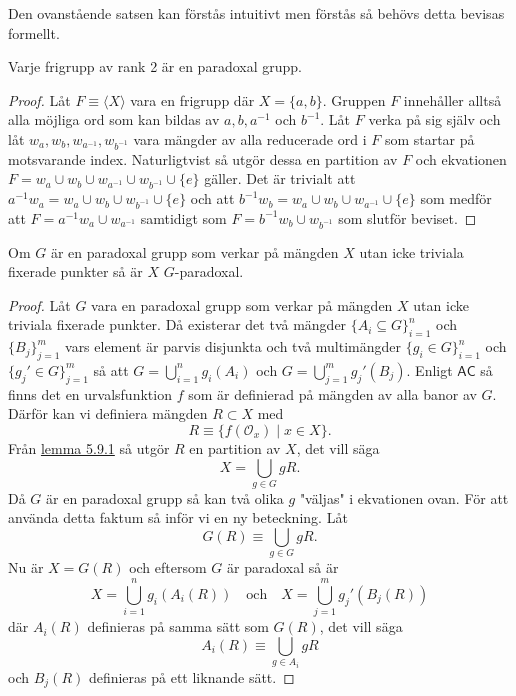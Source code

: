 \documentclass{article}
\newcommand{\orbit}[0]{\mathcal{O}}
\theoremstyle{definition}
\begin{document}
Den ovanstående satsen kan förstås intuitivt men förstås så behövs detta bevisas formellt. 

\hypertarget{sats8.2.2}{}
\begin{mytheo}{}{}
  Varje frigrupp av rank 2 är en paradoxal grupp. 
\end{mytheo}

\begin{proof}
  Låt $F \equiv \langle X \rangle$ vara en frigrupp där $X = \{a, b\}$. Gruppen $F$ innehåller alltså alla möjliga ord som kan bildas 
  av $a, b, a^{-1}$ och $b^{-1}$. Låt $F$ verka på sig själv och låt $w_a, w_b, w_{a^{-1}}, w_{b^{-1}}$ vara mängder av alla reducerade 
  ord i $F$ som startar på motsvarande index. Naturligtvist så utgör dessa en partition av $F$ 
  och ekvationen $F = w_a \cup w_b \cup w_{a^{-1}} \cup w_{b^{-1}} \cup \{e\}$ gäller.
  Det är trivialt att $a^{-1}w_a = w_a \cup w_b \cup w_{b^{-1}} \cup \{e\}$ och att $b^{-1}w_b = w_a \cup w_b \cup w_{a^{-1}} \cup \{e\}$
  som medför att $F = a^{-1} w_a \cup w_{a^{-1}}$ samtidigt som $F = b^{-1}w_b \cup w_{b^{-1}}$ som slutför beviset.
\end{proof}

\hypertarget{sats8.3.2}{}
\begin{mytheo}{}{}
  Om $G$ är en paradoxal grupp som verkar på mängden $X$ utan icke triviala fixerade punkter så är $X$ $G$-paradoxal. 
\end{mytheo}

\begin{proof}{}{}
  Låt $G$ vara en paradoxal grupp som verkar på mängden $X$ utan icke triviala fixerade punkter. Då existerar det 
  två mängder $\{A_i \subseteq G\}_{i = 1}^n$ och $\{B_j\}_{j = 1}^m$ vars element är parvis disjunkta och två multimängder 
  $\{g_i \in G\}_{i = 1}^n$ och $\{g_j' \in G\}_{j = 1}^m$ så att $G = \bigcup_{i = 1}^n g_i(A_i)$ och $G = \bigcup_{j = 1}^m g_j'(B_j)$. 
  Enligt $\mathsf{AC}$
  så finns det en urvalsfunktion $f$ som är definierad på mängden av alla banor av $G$. Därför kan vi definiera mängden $R \subset X$
  med 
  \[R \equiv \{f(\orbit_x) \; | \; x \in X\}.\]
  Från \hyperlink{lemma6.9.1}{lemma 5.9.1} så utgör $R$ en partition av $X$, det vill säga 
  \[X = \bigcup_{g \in G} gR.\]
  Då $G$ är en paradoxal grupp så kan två olika $g$ "väljas" i ekvationen ovan. För att använda detta faktum så inför vi en ny beteckning. 
  Låt 
  \[G(R) \equiv \bigcup_{g \in G} gR.\]
  Nu är $X = G(R)$ och eftersom $G$ är paradoxal så är 
  \[X = \bigcup_{i = 1}^n g_i(A_i(R)) \quad \text{och} \quad X = \bigcup_{j = 1}^m g_j'(B_j(R))\]
  där $A_i(R)$ definieras på samma sätt som $G(R)$, det vill säga
  \[A_i(R) \equiv \bigcup_{g \in A_i} gR\]
  och $B_j(R)$ definieras på ett liknande sätt.
\end{proof}
\end{document}
